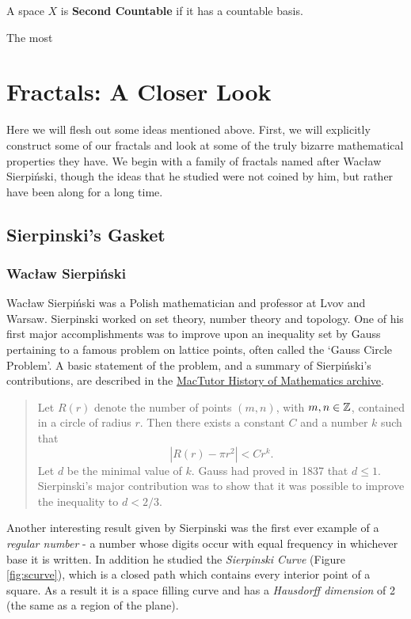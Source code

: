 \documentclass[11pt,oneside,final]{article}
\begin{document}
\begin{dfn} A space \(X\) is \textbf{Second Countable} if it has a countable
	basis. 
\end{dfn}

The most 
\section{Fractals: A Closer Look}
Here we will flesh out some ideas mentioned above. First, we will explicitly
construct some of our fractals and look at some of the truly bizarre
mathematical properties they have. We begin with a family of fractals named
after Wac\l{}aw Sierpi\'nski, though the ideas that he studied were not coined
by him, but rather have been along for a long time.



\subsection{Sierpinski's Gasket}
\subsubsection{Wac\l{}aw Sierpi\'nski} Wac\l{}aw Sierpi\'nski was a Polish
mathematician and professor at Lvov and Warsaw. Sierpinski worked on set
theory, number theory and topology. One of his first major accomplishments was
to improve upon an inequality set by Gauss \cite{st-andrews} pertaining to a
famous problem on lattice points, often called the `Gauss Circle Problem'. A
basic statement of the problem, and a summary of Sierpi\'nski's contributions,
are described in the \href{http://www-history.mcs.st-andrews.ac.uk/}{MacTutor
History of Mathematics archive}.

\begin{quotation}
	Let \(R(r)\) denote the number of points \((m,n)\), with \(m,n \in \mathbb Z\),
	contained in a circle of radius \(r\). Then there exists a constant \(C\)
	and a number \(k\) such that 
	\[|R(r) - \pi r^2| < Cr^k.\] 
	Let \(d\) be the minimal value of \(k\). Gauss had proved in 1837 that \(d
	\leq 1\). Sierpinski's major contribution was to show that it was possible
	to improve the inequality to \(d < 2/3\).\cite{st-andrews}
\end{quotation}

Another interesting result given by Sierpinski was the first ever example of 
a {\em regular number} - a number whose digits occur with equal frequency in
whichever base it is written.\cite{st-andrews} In addition he studied the
{\em Sierpinski Curve} (Figure \ref{fig:scurve}), which is a closed path which contains every 
interior point of a square. As a result it is a space filling curve and has
a {\em Hausdorff dimension} of 2 (the same as a region of the plane).\\
\end{document}
